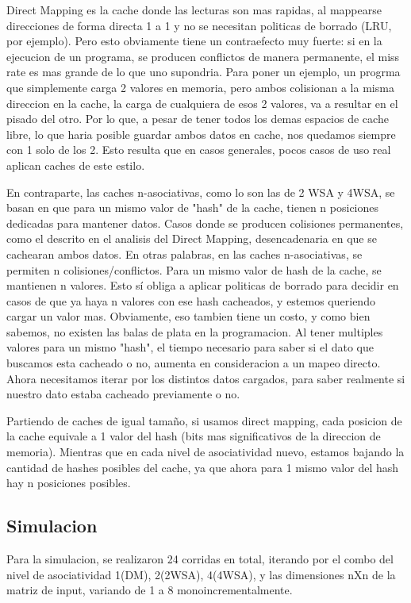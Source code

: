 \documentclass[11pt,a4paper]{article}
\begin{document}
Direct Mapping es la cache donde las lecturas son mas rapidas, al mappearse direcciones de forma directa 1 a 1 y no se necesitan politicas de borrado (LRU, por ejemplo). Pero esto obviamente tiene un contraefecto muy fuerte: si en la ejecucion de un programa, se producen conflictos de manera permanente, el miss rate es mas grande de lo que uno supondria. Para poner un ejemplo, un progrma que simplemente carga 2 valores en memoria, pero ambos colisionan a la misma direccion en la cache, la carga de cualquiera de esos 2 valores, va a resultar en el pisado del otro. Por lo que, a pesar de tener todos los demas espacios de cache libre, lo que haria posible guardar ambos datos en cache, nos quedamos siempre con 1 solo de los 2. Esto resulta que en casos generales, pocos casos de uso real aplican caches de este estilo.

En contraparte, las caches n-asociativas, como lo son las de 2 WSA y 4WSA, se basan en que para un mismo valor de "hash" de la cache, tienen n posiciones dedicadas para mantener datos. 
Casos donde se producen colisiones permanentes, como el descrito en el analisis del Direct Mapping, desencadenaria en que se cachearan ambos datos. En otras palabras, en las caches n-asociativas, se permiten n colisiones/conflictos. Para un mismo valor de hash de la cache, se mantienen n valores. Esto sí obliga a aplicar politicas de borrado para decidir en casos de que ya haya n valores con ese hash cacheados, y estemos queriendo cargar un valor mas. 
Obviamente, eso tambien tiene un costo, y como bien sabemos, no existen las balas de plata en la programacion. Al tener multiples valores para un mismo "hash", el tiempo necesario para saber si el dato que buscamos esta cacheado o no, aumenta en consideracion a un mapeo directo. Ahora necesitamos iterar por los distintos datos cargados, para saber realmente si nuestro dato estaba cacheado previamente o no. 

Partiendo de caches de igual tamaño, si usamos direct mapping, cada posicion de la cache equivale a 1 valor del hash (bits mas significativos de la direccion de memoria). Mientras que en cada nivel de asociatividad nuevo, estamos bajando la cantidad de hashes posibles del cache, ya que ahora para 1 mismo valor del hash hay n posiciones posibles.

\subsection{Simulacion}
Para la simulacion, se realizaron 24 corridas en total, iterando por el combo del nivel de asociatividad 1(DM), 2(2WSA), 4(4WSA), y las dimensiones nXn de la matriz de input, variando de 1 a 8 monoincrementalmente.
\end{document}
